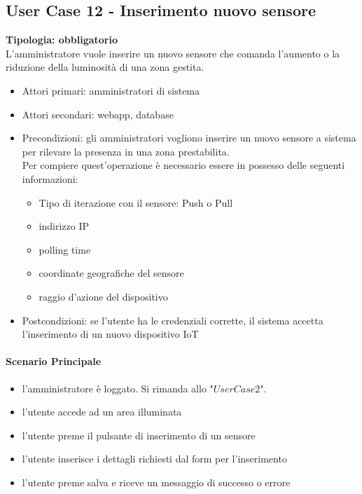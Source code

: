 \documentclass[12pt]{article}
\begin{document}
\subsection{User Case 12 - Inserimento nuovo sensore}
\textbf{Tipologia: obbligatorio}\\
L'amministratore vuole inserire un nuovo sensore che comanda l'aumento o la riduzione della luminosità di una zona gestita.
\begin{itemize}
	\item Attori primari: amministratori di sistema
	\item Attori secondari: webapp, database
	\item Precondizioni: gli amministratori vogliono inserire un nuovo sensore a sistema per rilevare la presenza in una zona prestabilita.\\
	 Per compiere quest'operazione è necessario essere in possesso delle seguenti informazioni: 
	\begin{itemize}
		\item Tipo di iterazione con il sensore: Push o Pull
		\item indirizzo IP
		\item polling time
		\item coordinate geografiche del sensore
		\item raggio d'azione del dispositivo
	\end{itemize}
	\item Postcondizioni: se l'utente ha le credenziali corrette, il sistema accetta l'inserimento di un nuovo dispositivo IoT
\end{itemize}
\paragraph{Scenario Principale}
\begin{itemize}
	\item l'amministratore è loggato. Si rimanda allo "$User Case 2$".
	\item l'utente accede ad un area illuminata
	\item l'utente preme il pulsante di inserimento di un sensore
	\item l'utente inserisce i dettagli richiesti dal form per l'inserimento
	\item l'utente preme salva e riceve un messaggio di successo o errore
\end{itemize}
\end{document}
